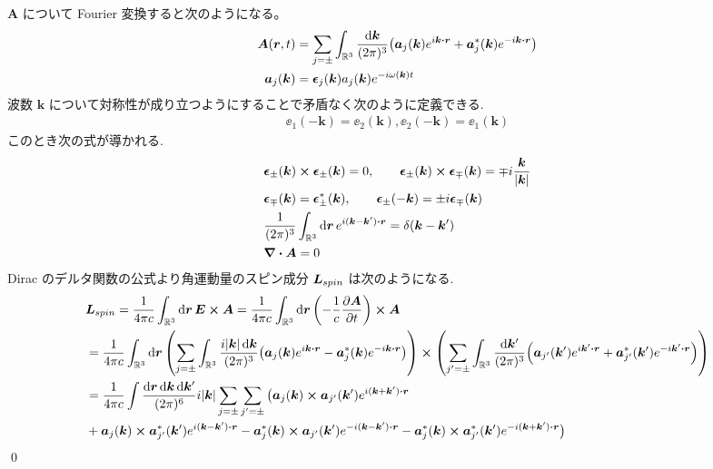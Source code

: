 \documentclass[uplatex,dvipdfmx,a4paper,11pt]{jlreq}
\makeatletter
\newcommand{\RR}{\mathbb{R}}
\newcommand{\EE}{\bm{E}}
\renewcommand{\AA}{\bm{A}}
\newcommand{\rr}{\bm{r}}
\newcommand{\kk}{\bm{k}}
\theoremstyle{definition}
\renewenvironment{proof}[1][\proofname]{\par
  \normalfont
  \topsep6\p@\@plus6\p@ \trivlist
  \item[\hskip\labelsep{\bfseries #1}\@addpunct{\bfseries}]\ignorespaces\quad\par
}{%
  \qed\endtrivlist\@endpefalse
}
\renewcommand\proofname{証明}
\makeatother
\begin{document}
\begin{proof}
  $\AA$ について Fourier 変換すると次のようになる。
  \begin{align}
    \AA(\rr, t)   & = \sum_{j=\pm}\int_{\RR^3}\frac{\dd{\kk}}{(2\pi)^3}\qty(\bm{a}_j(\kk)e^{i\kk\vdot\rr} + \bm{a}_j^*(\kk)e^{-i\kk\vdot\rr}) \\
    \bm{a}_j(\kk) & = \ee_j(\kk)a_j(\kk)e^{-i\omega(\kk)t}
  \end{align}
  波数 $\kk$ について対称性が成り立つようにすることで矛盾なく次のように定義できる.
  \begin{align}
    \ee_1(-\kk) = \ee_2(\kk), \ee_2(-\kk) = \ee_1(\kk)
  \end{align}
  このとき次の式が導かれる.
  \begin{align}
     & \ee_\pm(\kk)\cross\ee_\pm(\kk) = 0, \qquad \ee_\pm(\kk)\cross\ee_\mp(\kk) = \mp i\frac{\kk}{|\kk|} \\
     & \ee_\mp(\kk) = \ee_\pm^*(\kk), \qquad \ee_\pm(-\kk) = \pm i\ee_\mp(\kk)                            \\
     & \frac{1}{(2\pi)^3}\int_{\RR^3}\dd{\rr}e^{i(\kk - \kk')\vdot\rr} = \delta(\kk - \kk')               \\
     & \vnabla\vdot\AA = 0
  \end{align}
  Dirac のデルタ関数の公式より角運動量のスピン成分 $\bm{L}_{spin}$ は次のようになる.
  \begin{align}
     & \LL_{spin} = \frac{1}{4\pi c}\int_{\RR^3}\dd{\rr}\EE\cross\AA = \frac{1}{4\pi c}\int_{\RR^3}\dd{\rr}\qty(-\frac{1}{c}\pdv{\AA}{t})\cross\AA                                                                                                                                                                              \\
     & = \frac{1}{4\pi c}\int_{\RR^3}\dd{\rr}\qty(\sum_{j=\pm}\int_{\RR^3}\frac{i|\kk|\dd{\kk}}{(2\pi)^3}\qty(\bm{a}_j(\kk)e^{i\kk\vdot\rr} - \bm{a}_j^*(\kk)e^{-i\kk\vdot\rr}))\cross\qty(\sum_{j'=\pm}\int_{\RR^3}\frac{\dd{\kk'}}{(2\pi)^3}\qty(\bm{a}_{j'}(\kk')e^{i\kk'\vdot\rr} + \bm{a}_{j'}^*(\kk')e^{-i\kk'\vdot\rr})) \\
     & = \frac{1}{4\pi c}\int\frac{\dd{\rr}\dd{\kk}\dd{\kk'}}{(2\pi)^6}i|\kk|\sum_{j=\pm}\sum_{j'=\pm}\big(\bm{a}_j(\kk)\cross\bm{a}_{j'}(\kk')e^{i(\kk + \kk')\vdot\rr}                                                                                                                                                        \\
     & + \bm{a}_j(\kk)\cross\bm{a}_{j'}^*(\kk')e^{i(\kk - \kk')\vdot\rr} - \bm{a}_j^*(\kk)\cross\bm{a}_{j'}(\kk')e^{-i(\kk - \kk')\vdot\rr} - \bm{a}_j^*(\kk)\cross\bm{a}_{j'}^*(\kk')e^{-i(\kk+\kk')\vdot\rr}\big)                                                                                                             \\

\end{align}
\end{proof}
\end{document}
